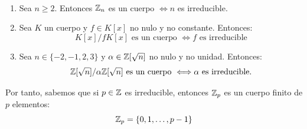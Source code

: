 \begin{coro}~
    \begin{enumerate}
        \item Sea $n\geq 2$. Entonces $\mathbb Z_n$ es un cuerpo $\Longleftrightarrow n$ es irreducible.
        
        \item Sea $K$ un cuerpo y $f \in K[x]$ no nulo y no constante. Entonces:
        \begin{equation*}
            K[x]/fK[x] \text{ es un cuerpo } \Longleftrightarrow f \text{ es irreducible}
        \end{equation*}

        \item Sea $n\in \{-2, -1, 2, 3\}$ y $\alpha \in \mathbb Z[\sqrt{n}]$ no nulo y no unidad. Entonces:
        \begin{equation*}
            \mathbb Z[\sqrt{n}]/\alpha \mathbb Z[\sqrt{n}] \text{ es un cuerpo } \Longleftrightarrow \alpha \text{ es irreducible.}
        \end{equation*}
    \end{enumerate}
\end{coro}

Por tanto, sabemos que si $p \in \mathbb Z$ es irreducible, entonces $\mathbb Z_p$ es un cuerpo finito de $p$ elementos:
$$\mathbb Z_p = \{0, 1, \ldots, p-1\}$$

